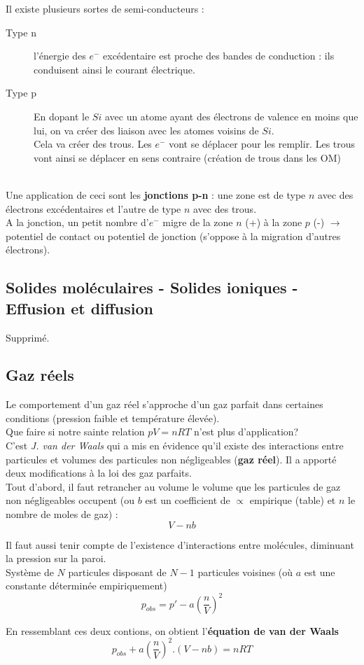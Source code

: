 \documentclass[12pt, a4paper]{article}
\begin{document}
Il existe plusieurs sortes de semi-conducteurs : 
\begin{description}
\item[Type n] l'énergie des $e^-$ excédentaire est proche des bandes de conduction : ils conduisent ainsi le courant électrique.
\item[Type p] En dopant le $Si$ avec un atome ayant des électrons de valence en moins que lui, on va créer des liaison avec les atomes voisins de $Si$.\\
Cela va créer des trous. Les $e^-$ vont se déplacer pour les remplir. Les trous vont ainsi se déplacer en sens contraire (création de trous dans les OM)
\end{description}
\ \\

Une application de ceci sont les \textbf{jonctions p-n} : une zone est de type $n$ avec des électrons excédentaires et l'autre de type $n$ avec des trous.\\
A la jonction, un petit nombre d'$e^-$ migre de la zone $n$ (+) à la zone $p$ (-) $\rightarrow$ potentiel de contact ou potentiel de jonction (s'oppose à la migration d'autres électrons).



\subsection{Solides moléculaires - Solides ioniques - Effusion et diffusion}
Supprimé.

\subsection{Gaz réels}
Le comportement d'un gaz réel s'approche d'un gaz parfait dans certaines conditions (pression faible et température élevée).\\
Que faire si notre sainte relation $pV = nRT$ n'est plus d'application? \\

C'est \textit{J. van der Waals} qui a mis en évidence qu'il existe des interactions entre particules et volumes des particules non négligeables (\textbf{gaz réel}). Il a apporté deux modifications à la loi des gaz parfaits.\\

Tout d'abord, il faut retrancher au volume le volume que les particules de gaz non négligeables occupent (ou $b$ est un coefficient de $\propto$ empirique (table) et $n$ le nombre de moles de gaz) :
$$V - nb$$

Il faut aussi tenir compte de l'existence d'interactions entre molécules, diminuant la pression sur la paroi.\\
Système de $N$ particules disposant de $N-1$ particules voisines (où $a$ est une constante déterminée empiriquement)
$$p_{obs} = p' - a\left(\frac{n}{V}\right)^2$$

En ressemblant ces deux contions, on obtient l'\textbf{équation de van der Waals}
$$p_{obs} + a\left(\frac{n}{V}\right)^2 .\left(V -nb\right) = nRT$$
\end{document}
